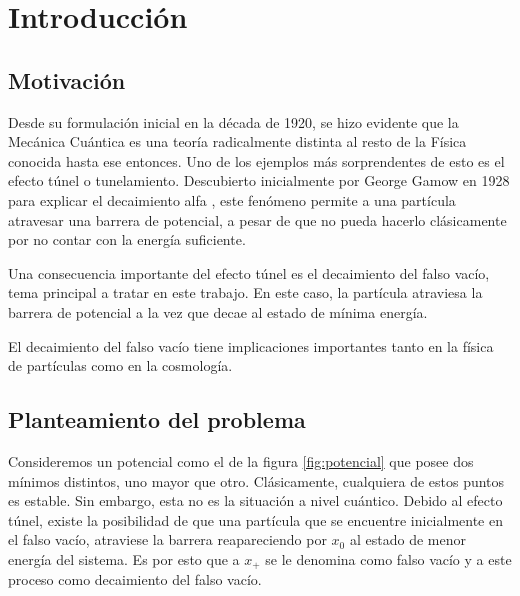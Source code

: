
\chapter{Introducción} %

\section{Motivación}

Desde su formulación inicial en la década de 1920, se hizo evidente que la Mecánica Cuántica es una teoría radicalmente distinta al resto de la Física conocida hasta ese entonces. Uno de los ejemplos más sorprendentes de esto es el efecto túnel o tunelamiento. Descubierto inicialmente por George Gamow en 1928 para explicar el decaimiento alfa \cite{gamow1928quantum}, este fenómeno permite a una partícula atravesar una barrera de potencial, a pesar de que no pueda hacerlo clásicamente por no contar con la energía suficiente. 

Una consecuencia importante del efecto túnel es el decaimiento del falso vacío, tema principal a tratar en este trabajo. En este caso, la partícula atraviesa la barrera de potencial a la vez que decae al estado de mínima energía. 

El decaimiento del falso vacío tiene implicaciones importantes tanto en la física de partículas como en la cosmología. 


\section{Planteamiento del problema}

Consideremos un potencial como el de la figura \ref{fig:potencial} que posee dos mínimos distintos, uno mayor que otro. Clásicamente, cualquiera de estos puntos es estable. Sin embargo, esta no es la situación a nivel cuántico. Debido al efecto túnel, existe la posibilidad de que una partícula que se encuentre inicialmente en el falso vacío, atraviese la barrera reapareciendo por $x_0$                                                                                                                                                                                                                                                                                                                                                                                                                                                                                                                                                                                                                                                                                                                                                   al estado de menor energía del sistema. Es por esto que a $x_+$ se le denomina como falso vacío y a este proceso como decaimiento del falso vacío.

